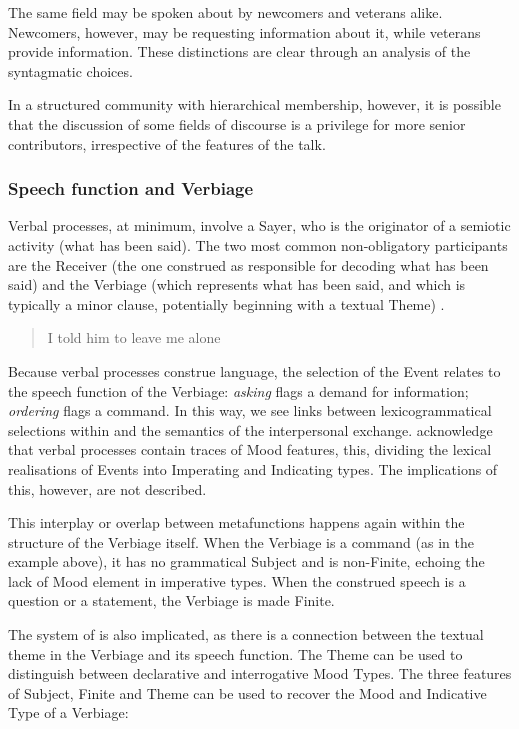 
The same field may be spoken about by newcomers and veterans alike. Newcomers, however, may be requesting information about it, while veterans provide information. These distinctions are clear through an analysis of the syntagmatic  choices.

In a structured community with hierarchical membership, however, it is possible that the discussion of some fields of discourse is a privilege for more senior contributors, irrespective of the  features of the talk. 


\subsubsection{Speech function and Verbiage}

Verbal processes, at minimum, involve a Sayer, who is the originator of a semiotic activity (what has been said). The two most common non-obligatory participants are the Receiver (the one construed as responsible for decoding what has been said) and the Verbiage (which represents what has been said, and which is typically a minor clause, potentially beginning with a textual Theme) \cite[p.~151]{halliday1999construing}.

\begin{quotation}
I told him to leave me alone
\end{quotation}

Because verbal processes construe language, the selection of the Event relates to the speech function of the Verbiage: \emph{asking} flags a demand for information; \emph{ordering} flags a command. In this way, we see links between lexicogrammatical selections within  and the semantics of the interpersonal exchange. \textcite{halliday_introduction_2004} acknowledge that verbal processes contain traces of Mood features, this, dividing the lexical realisations of Events into Imperating and Indicating types. The implications of this, however, are not described.

This interplay or overlap between metafunctions happens again within the structure of the Verbiage itself. When the Verbiage is a command (as in the example above), it has no grammatical Subject and is non-Finite, echoing the lack of Mood element in imperative types. When the construed speech is a question or a statement, the Verbiage is made Finite.

The system of  is also implicated, as there is a connection between the textual theme in the Verbiage and its speech function. The \gls{Theme} can be used to distinguish between declarative and interrogative Mood Types. The three features of Subject, Finite and Theme can be used to recover the Mood and Indicative Type of a Verbiage:

